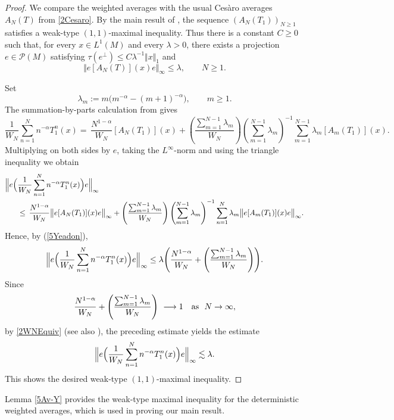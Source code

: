 \documentclass[12pt]{amsart}
\renewcommand{\P}{\mbox{${\mathcal P}$}}
\newcommand{\norm}[1]{\Vert#1\Vert}
\newcommand{\bignorm}[1]{\bigl\Vert#1\bigr\Vert}
\newcommand{\Bignorm}[1]{\Bigl\Vert#1\Bigr\Vert}
\theoremstyle{remark}
\theoremstyle{definition}
\numberwithin{equation}{section}
\begin{document}
\begin{proof}
We compare the weighted averages with the usual Ces\`aro averages
$A_N(T)$ from \eqref{2Cesaro}. By the main result of \cite{Ye}, the
sequence $(A_N(T_1))_{N\geq1}$ satisfies a weak-type $(1,1)$-maximal
inequality. Thus there is a constant $C\geq0$ such that, for every
$x\in L^1(M)$ and every $\lambda>0$, there exists a projection
$e\in\P(M)$ satisfying $\tau(e^\perp)\leq C\lambda^{-1}\norm{x}_1$
and 
\begin{equation}\label{5Yeadon}
\bignorm{e[A_N(T)](x)e}_\infty\leq\lambda,\qquad N\geq 1.
\end{equation}

Set
\[
\lambda_m := m \bigl(m^{-\alpha} - (m+1)^{-\alpha}\bigr),
\qquad m\geq 1.
\]
The summation-by-parts calculation from \cite[Lemma 4.2]{LZ} gives
$$
\frac{1}{W_N} \sum_{n=1}^N n^{-\alpha} T_1^n(x) =\,\frac{N^{1-\alpha}}{W_N} 
[A_N(T_1)](x) + 
\left(\frac{\sum_{m=1}^{N-1} \lambda_m}{W_N}\right)
\left(\sum_{m=1}^{N-1} \lambda_m\right)^{-1}
\sum_{m=1}^{N-1} \lambda_m [A_m(T_1)](x).
$$
Multiplying on both sides by $e$, taking the $L^\infty$-norm and using the triangle inequality we obtain
\begin{align*}
\Bignorm{e\Bigl(&\frac{1}{W_N}  \sum_{n=1}^N n^{-\alpha} T_1^n(x)\Bigr)e}_\infty \\
&\leq \,\frac{N^{1-\alpha}}{W_N} \bignorm{e[A_N(T_1)](x)e}_\infty
+ \left(\frac{\sum_{m=1}^{N-1} \lambda_m}{W_N}\right)
\left(\sum_{m=1}^{N-1} \lambda_m\right)^{-1}
\sum_{n=1}^N \lambda_m \bignorm{e[A_m(T_1)](x)e}_\infty.
\end{align*}
Hence, by (\ref{5Yeadon}),
$$
\Bignorm{e\Bigl(\frac{1}{W_N}  \sum_{n=1}^N n^{-\alpha} T_1^n(x)\Bigr)e}_\infty
\leq \lambda\Biggl( \frac{N^{1-\alpha}}{W_N}
+ \left(\frac{\sum_{m=1}^{N-1} \lambda_m}{W_N}\right)\Biggr).
$$
Since 
$$
 \frac{N^{1-\alpha}}{W_N}
+ \left(\frac{\sum_{m=1}^{N-1} \lambda_m}{W_N}\right)\ \longrightarrow 1\quad
\hbox{as } \ N\to\infty,
$$
by \eqref{2WNEquiv} (see also \cite{LZ}), the preceding estimate yields the  estimate
$$
\Bignorm{e\Bigl(\frac{1}{W_N} \sum_{n=1}^N n^{-\alpha} T_1^n(x)\Bigr)e}_\infty
\lesssim \lambda.
$$
This shows the desired weak-type
$(1,1)$-maximal inequality.
\end{proof}

Lemma \ref{5Av-Y} provides the weak-type maximal inequality for the deterministic weighted averages, which is used in proving our main result.
\end{document}
